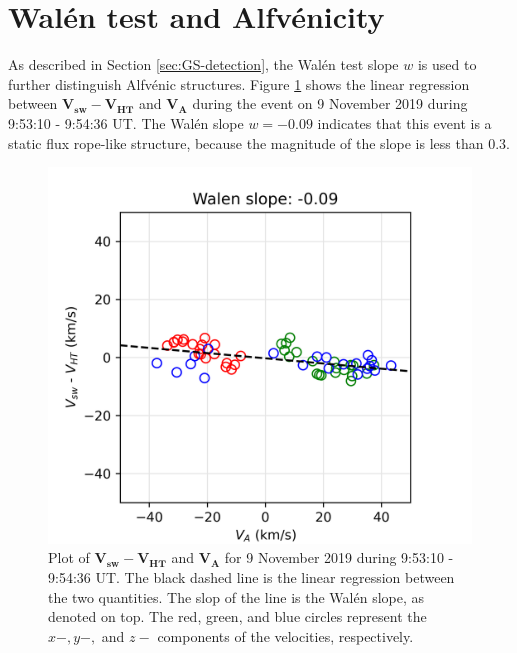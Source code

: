 \section{Wal\'en test and Alfv\'enicity}
As described in Section \ref{sec:GS-detection}, the Wal\'en test slope $w$ is used to further distinguish Alfv\'enic structures. Figure \ref{fig:walen-slope-20191109} shows the linear regression between $\mathbf{V_{sw}} - \mathbf{V_{HT}}$ and $\mathbf{V_A}$ during the event on 9 November 2019 during 9:53:10 - 9:54:36 UT. The Wal\'en slope $w=-0.09$ indicates that this event is a static flux rope-like structure, because the magnitude of the slope is less than 0.3.
\begin{figure}
    \centering
    \includegraphics[width=\textwidth]{Figures/Reconstructions/MMS1_20191109095310_20191109095436_walen_relation.png}
    \caption[Plot of Wal\'en slope for 9 November 2019 9:53:10 - 9:54:36 UT]{Plot of $\mathbf{V_{sw}} - \mathbf{V_{HT}}$ and $\mathbf{V_A}$ for 9 November 2019 during 9:53:10 - 9:54:36 UT. The black dashed line is the linear regression between the two quantities. The slop of the line is the Wal\'en slope, as denoted on top. The red, green, and blue circles represent the $x-,y-,$ and $z-$ components of the velocities, respectively.}
    \label{fig:walen-slope-20191109}
\end{figure}

